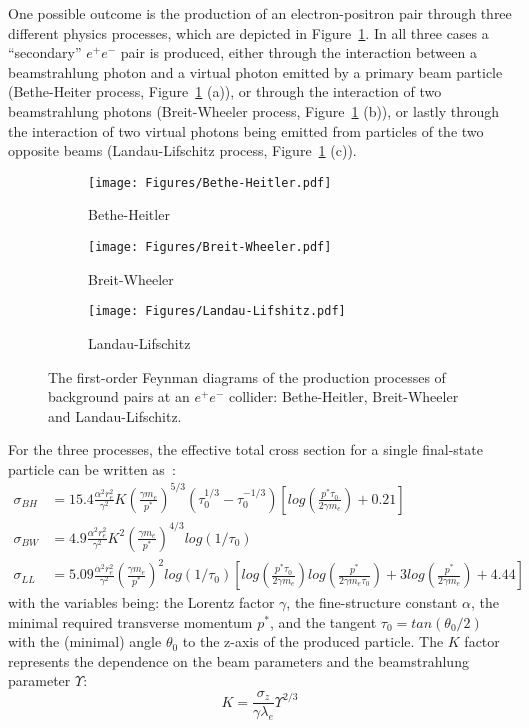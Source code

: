 One possible outcome is the production of an electron-positron pair through three different physics processes, which are depicted in Figure~\ref{fig:Feynman:pair_production}.
In all three cases a ``secondary'' $e^+e^-$ pair is produced, either through the interaction between a beamstrahlung photon and a virtual photon emitted by a primary beam particle (Bethe-Heiter process, Figure~\ref{fig:Feynman:pair_production} (a)),
or through the interaction of two beamstrahlung photons (Breit-Wheeler process, Figure~\ref{fig:Feynman:pair_production} (b)),
or lastly through the interaction of two virtual photons being emitted from particles of the two opposite beams (Landau-Lifschitz process, Figure~\ref{fig:Feynman:pair_production} (c)).
\begin{figure}[h]
\begin{subfigure}[b]{0.33\textwidth}
\texttt{[image: Figures/Bethe-Heitler.pdf]}
\caption{Bethe-Heitler}
\end{subfigure}
\begin{subfigure}[b]{0.33\textwidth}
\texttt{[image: Figures/Breit-Wheeler.pdf]}
\caption{Breit-Wheeler}
\end{subfigure}
\begin{subfigure}[b]{0.33\textwidth}
\texttt{[image: Figures/Landau-Lifshitz.pdf]}
\caption{Landau-Lifschitz}
\end{subfigure}
\caption[Feynman diagrams of the production of the background pairs.]{The first-order Feynman diagrams of the production processes of background pairs at an $e^+e^-$ collider: Bethe-Heitler, Breit-Wheeler and Landau-Lifschitz.}
\label{fig:Feynman:pair_production}
\end{figure}

For the three processes, the effective total cross section for a single final-state particle can be written as~\cite{PairBkg_cross_section}:
\begin{align}
 \sigma_{BH} &= 15.4\frac{\alpha^2 r_e^2}{\gamma^2}K  \left(\frac{\gamma m_e}{p^*}\right)^{5/3}(\tau_0^{1/3}-\tau_0^{-1/3})\left[log\left(\frac{p^*\tau_0}{2\gamma m_e}\right)+0.21\right]\\
 \sigma_{BW} &= 4.9\frac{\alpha^2 r_e^2}{\gamma^2}K^2  \left(\frac{\gamma m_e}{p^*}\right)^{4/3}  log(1/\tau_0)\\
 \sigma_{LL} &= 5.09\frac{\alpha^2 r_e^2}{\gamma^2} \left(\frac{\gamma m_e}{p^*}\right)^2 log(1/\tau_0) \left[log\left(\frac{p^*\tau_0}{2\gamma m_e}\right) log\left(\frac{p^*}{2\gamma m_e\tau_0}\right) + 3 log\left(\frac{p^*}{2\gamma m_e}\right) + 4.44\right]
\end{align}
with the variables being:
the Lorentz factor $\gamma$, 
the fine-structure constant $\alpha$, 
the minimal required transverse momentum $p^*$,
and the tangent $\tau_0=tan(\theta_0/2)$ with the (minimal) angle $\theta_0$ to the z-axis of the produced particle.
The $K$ factor represents the dependence on the beam parameters and the beamstrahlung parameter $\Upsilon$:
\begin{equation}
 K=\frac{\sigma_z}{\gamma\lambda_e}\Upsilon^{2/3}
\end{equation}


